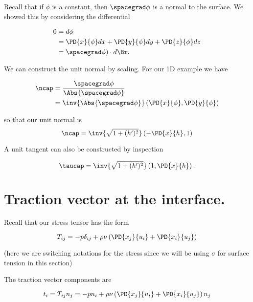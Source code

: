 Recall that if $\phi$ is a constant, then $\spacegrad \phi$ is a normal to the surface.  We showed this by considering the differential

\begin{align*}
0 
&= d\phi \\
&= 
\PD{x}{\phi} dx
+\PD{y}{\phi} dy
+\PD{z}{\phi} dz \\
&=
\spacegrad \phi) \cdot d\Br.
\end{align*}

We can construct the unit normal by scaling.  For our 1D example we have

\begin{align*}
\ncap 
&= \frac{\spacegrad \phi}{\Abs{\spacegrad \phi}} \\
&= \inv{\Abs{\spacegrad \phi}} 
\left(
\PD{x}{\phi},
\PD{y}{\phi}
\right) 
\end{align*}

so that our unit normal is
\begin{equation}\label{eqn:continuumL14:50}
\ncap 
= \inv{ \sqrt{1 + (h')^2}}
\left( -\PD{x}{h}, 1 \right)
\end{equation}

A unit tangent can also be constructed by inspection

\begin{equation}\label{eqn:continuumL14:70}
\taucap 
= \inv{ \sqrt{1 + (h')^2}}
\left( 1, \PD{x}{h} \right).
\end{equation}

\section{Traction vector at the interface.}

Recall that our stress tensor has the form

\begin{equation}\label{eqn:continuumL14:90}
T_{ij} = 
- p \delta_{ij} + \rho \nu \left( 
\PD{x_j}{u_i}
+\PD{x_i}{u_j}
\right)
\end{equation}

(here we are switching notations for the stress since we will be using $\sigma$ for surface tension in this section)

The traction vector components are

\begin{equation}\label{eqn:continuumL14:110}
t_i = T_{ij} n_j =
- p n_i + \rho \nu \left( 
\PD{x_j}{u_i}
+\PD{x_i}{u_j}
\right) n_j
\end{equation}

